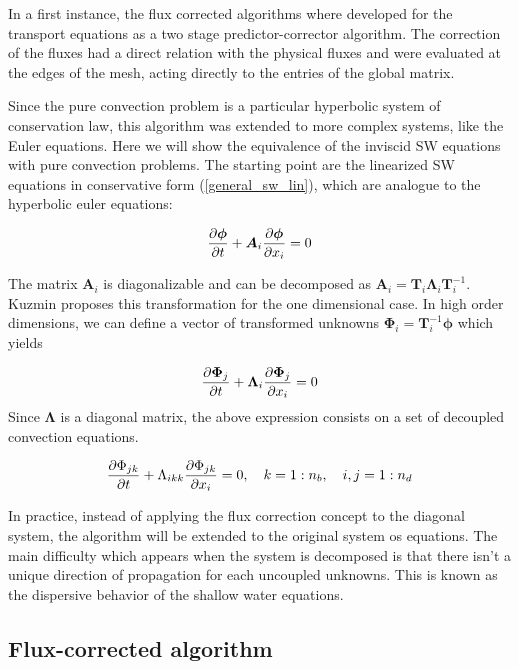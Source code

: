 In a first instance, the flux corrected algorithms where developed for the transport equations as a two stage predictor-corrector algorithm. The correction of the fluxes had a direct relation with the physical fluxes and were evaluated at the edges of the mesh, acting directly to the entries of the global matrix.

Since the pure convection problem is a particular hyperbolic system of conservation law, this algorithm was extended to more complex systems, like the Euler equations. Here we will show the equivalence of the inviscid SW equations with pure convection problems.
The starting point are the linearized SW equations in conservative form (\ref{general_sw_lin}), which are analogue to the hyperbolic euler equations:

\begin{equation}
\frac{\partial\bm\phi}{\partial t} + \bm A_i \frac{\partial\bm\phi}{\partial x_i} = 0
\end{equation}

The matrix $\bm A_i$ is diagonalizable and can be decomposed as $\bm A_i = \bm T_i \bm\Lambda_i \bm T_i^{-1}$. Kuzmin \cite{kuzmin2005b} proposes this transformation for the one dimensional case. In high order dimensions, we can define a vector of transformed unknowns $\bm\Phi_i = \bm T_i^{-1}\bm\phi$ which yields


\begin{equation}
\frac{\partial\bm\Phi_j}{\partial t} + \bm\Lambda_i \frac{\partial\bm\Phi_j}{\partial x_i} = 0
\end{equation}
Since $\bm\Lambda$ is a diagonal matrix, the above expression consists on a set of decoupled convection equations.

\begin{equation}
\frac{\partial\Phi_{jk}}{\partial t} + \Lambda_{ikk} \frac{\partial\Phi_{jk}}{\partial x_i} = 0 , \quad
k = 1:n_b , \quad
i,j = 1:n_d
\end{equation}

In practice, instead of applying the flux correction concept to the diagonal system, the algorithm will be extended to the original system os equations. The main difficulty which appears when the system is decomposed is that there isn't a unique direction of propagation for each uncoupled unknowns. This is known as the dispersive behavior of the shallow water equations.



\subsection{Flux-corrected algorithm}

